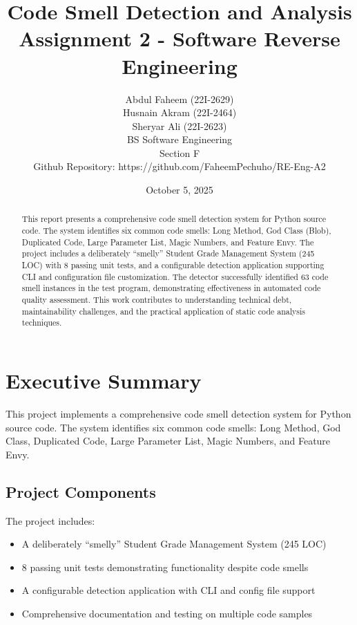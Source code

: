 \documentclass[11pt,a4paper]{article}
\title{\textbf{Code Smell Detection and Analysis} \\ \large{Assignment 2 - Software Reverse Engineering}}
\author{Abdul Faheem (22I-2629) \\ Husnain Akram (22I-2464) \\ Sheryar Ali (22I-2623) \\ BS Software Engineering \\ Section F \\
Github Repository: https://github.com/FaheemPechuho/RE-Eng-A2}
\date{October 5, 2025}
\begin{document}
\maketitle

\begin{abstract}
This report presents a comprehensive code smell detection system for Python source code. The system identifies six common code smells: Long Method, God Class (Blob), Duplicated Code, Large Parameter List, Magic Numbers, and Feature Envy. The project includes a deliberately ``smelly'' Student Grade Management System (245 LOC) with 8 passing unit tests, and a configurable detection application supporting CLI and configuration file customization. The detector successfully identified 63 code smell instances in the test program, demonstrating effectiveness in automated code quality assessment. This work contributes to understanding technical debt, maintainability challenges, and the practical application of static code analysis techniques.
\end{abstract}

\tableofcontents
\newpage

\section{Executive Summary}

This project implements a comprehensive code smell detection system for Python source code. The system identifies six common code smells: Long Method, God Class, Duplicated Code, Large Parameter List, Magic Numbers, and Feature Envy. 

\subsection{Project Components}

The project includes:

\begin{itemize}[noitemsep]
    \item A deliberately ``smelly'' Student Grade Management System (245 LOC)
    \item 8 passing unit tests demonstrating functionality despite code smells
    \item A configurable detection application with CLI and config file support
    \item Comprehensive documentation and testing on multiple code samples
\end{itemize}
\end{document}
